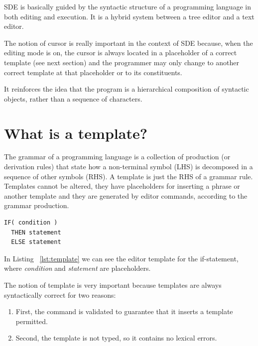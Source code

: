 \documentclass[
  oneside,
  11pt, a4paper,
  footinclude=true,
  headinclude=true,
  cleardoublepage=empty
]{scrbook}
\begin{document}
SDE is basically guided by the syntactic structure of a programming language in both editing and execution. It is a hybrid system between a tree editor and a text editor.

The notion of cursor is really important in the context of SDE because, when the editing mode is on, the cursor is always located in a placeholder of a correct template (see next section) and the programmer may only change to another correct template at that placeholder or to its constituents.%

It reinforces the idea that the program is a hierarchical composition of syntactic objects, rather than a sequence of characters.

\section {What is a template?}

The grammar of a programming language is a collection of production (or derivation rules) that state how a non-terminal symbol (LHS) is decomposed in a sequence of other symbols (RHS). A template is just the RHS of a grammar rule.
Templates cannot be altered, they have placeholders for inserting a phrase or another template and they are generated by editor commands, according to the grammar production. %


\begin{lstlisting}[caption={Example of a IF Conditional template},label={lst:template}]
IF( condition )
  THEN statement
  ELSE statement
\end{lstlisting}

In Listing ~\ref{lst:template} we can see the editor template for the if-statement, where \textit{condition} and \textit{statement} are placeholders.

The notion of template is very important because templates are always syntactically correct for two reasons:

\begin{enumerate}
  \item First, the command is validated to guarantee that it inserts a template permitted. %

  \item Second, the template is not typed, so it contains no lexical errors.

\end{enumerate}
\end{document}
